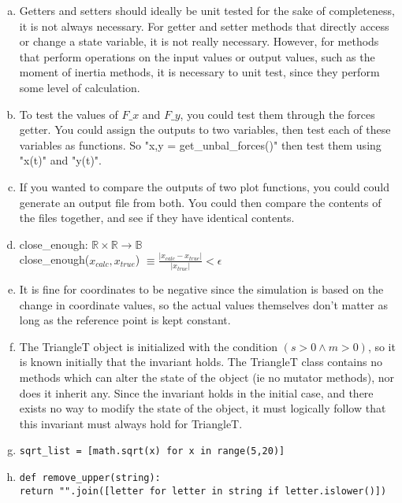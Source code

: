 \documentclass[12pt]{article}
\begin{document}
\begin{enumerate}[a)]

\item Getters and setters should ideally be unit tested for the sake of completeness, it is not always necessary. For getter and setter methods that directly access or change a state variable, it is not really necessary. However, for methods that perform operations on the input values or output values, such as the moment of inertia methods, it is necessary to unit test, since they perform some level of calculation.

\item To test the values of $F\_x$ and $F\_y$, you could test them through the forces getter. You could assign the outputs to two variables, then test each of these variables as functions. So "x,y = get\_unbal\_forces()" then test them using "x(t)" and "y(t)".

\item If you wanted to compare the outputs of two plot functions, you could could generate an output file from both. You could then compare the contents of the files together, and see if they have identical contents.

\item close\_enough: $\mathbb{R} \times \mathbb{R} \rightarrow \mathbb{B}$ \\
close\_enough($x_{calc} , x_{true}$) $\equiv \frac{|x_{calc} - x_{true}|}{|x_{true}|} < \epsilon$

\item It is fine for coordinates to be negative since the simulation is based on the change in coordinate values, so the actual values themselves don't matter as long as the reference point is kept constant.

\item The TriangleT object is initialized with the condition $(s > 0 \land m > 0)$, so it is known initially that the invariant holds. The TriangleT class contains no methods which can alter the state of the object (ie no mutator methods), nor does it inherit any. Since the invariant holds in the initial case, and there exists no way to modify the state of the object, it must logically follow that this invariant must always hold for TriangleT.

\item \texttt{sqrt\_list = [math.sqrt(x) for x in range(5,20)]}

\item \texttt{def remove\_upper(string):} \\
\text{\quad} \texttt{return "".join([letter for letter in string if letter.islower()])}


\end{enumerate}
\end{document}
